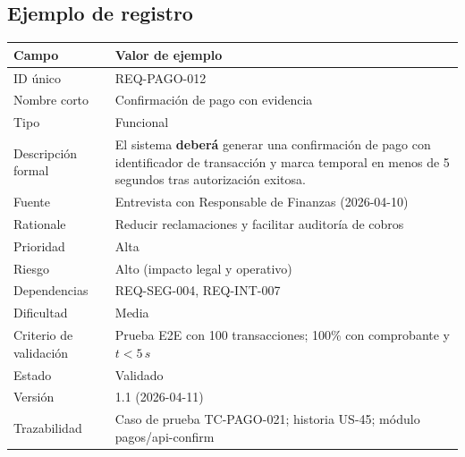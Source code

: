 \subsection*{Ejemplo de registro}
\begin{tabular}{|p{}|p{}|}
\hline
\textbf{Campo} & \textbf{Valor de ejemplo} \\
\hline
ID \'unico & REQ-PAGO-012 \\
\hline
Nombre corto & Confirmaci\'on de pago con evidencia \\
\hline
Tipo & Funcional \\
\hline
Descripci\'on formal & El sistema \textbf{deber\'a} generar una confirmaci\'on de pago con identificador de transacci\'on y marca temporal en menos de 5 segundos tras autorizaci\'on exitosa. \\
\hline
Fuente & Entrevista con Responsable de Finanzas (2026-04-10) \\
\hline
Rationale & Reducir reclamaciones y facilitar auditor\'ia de cobros \\
\hline
Prioridad & Alta \\
\hline
Riesgo & Alto (impacto legal y operativo) \\
\hline
Dependencias & REQ-SEG-004, REQ-INT-007 \\
\hline
Dificultad & Media \\
\hline
Criterio de validaci\'on & Prueba E2E con 100 transacciones; 100\% con comprobante y $t < 5\,s$ \\
\hline
Estado & Validado \\
\hline
Versi\'on & 1.1 (2026-04-11) \\
\hline
Trazabilidad & Caso de prueba TC-PAGO-021; historia US-45; m\'odulo pagos/api-confirm \\
\hline
\end{tabular}


